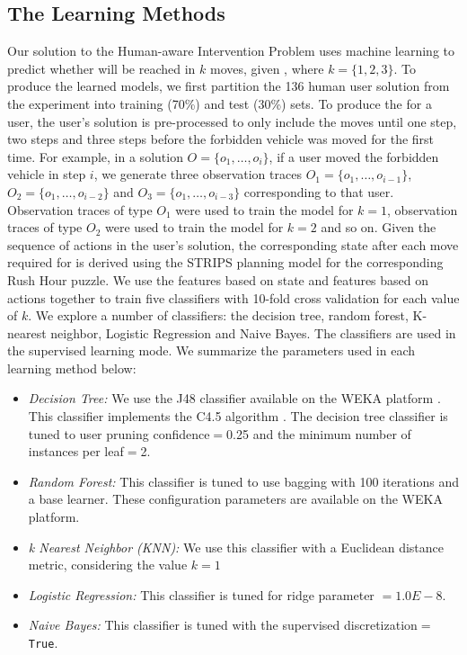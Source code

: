 \subsection{The Learning Methods}
\label{sec:learningmethods}
Our solution to the Human-aware Intervention Problem uses machine learning to predict whether \undesired will be reached in $k$ moves, given \historyDef, where $k=\lbrace 1,2,3\rbrace$.
To produce the learned models, we first partition the 136 human user solution from the experiment into training (70\%) and test (30\%) sets. 
To produce the \historyDef for a user, the user's solution is pre-processed to only include the moves until one step, two steps and three steps before the forbidden vehicle was moved for the first time. 
For example, in a  solution $O=\lbrace o_1, \ldots, o_i\rbrace$, if a user moved the forbidden vehicle in step $i$, we generate three observation traces $O_1=\lbrace o_1, \ldots, o_{i-1}\rbrace$, $O_2=\lbrace o_1, \ldots, o_{i-2}\rbrace$ and $O_3=\lbrace o_1, \ldots, o_{i-3}\rbrace$ corresponding to that user. 
Observation traces of type $O_1$ were used to train the model for $k=1$, observation traces of type $O_2$ were used to train the model for $k=2$ and so on.
Given the sequence of actions in the user's solution, the corresponding state after each move required for \historyDef is derived using the STRIPS planning model for the corresponding Rush Hour puzzle.
We use the features based on state and features based on actions together to train five classifiers with 10-fold cross validation for each value of $k$. 
We explore a number of classifiers: the decision tree, random forest, K-nearest neighbor, Logistic Regression and Naive Bayes. 
The classifiers are used in the supervised learning mode. 
We summarize the parameters used in each learning method below:
\begin{itemize}
\item \textit{Decision Tree:} We use the J48 classifier available on the WEKA platform \cite{hall09}. This classifier implements the C4.5 algorithm \cite{quinlan1993c45}. The decision tree classifier is tuned to user pruning confidence$=$0.25 and the minimum number of instances per leaf$=$2.
\item \textit{Random Forest:} This classifier is tuned to use bagging with 100 iterations and a base learner. These configuration parameters are available on the WEKA platform. 
\item \textit{k Nearest Neighbor (KNN):} We use this classifier with a Euclidean distance metric, considering the value $k=1$
\item \textit{Logistic Regression:} This classifier is tuned for ridge parameter $= 1.0E-8$.
\item \textit{Naive Bayes:} This classifier is tuned with the supervised discretization$=$\texttt{True}.
\end{itemize}


